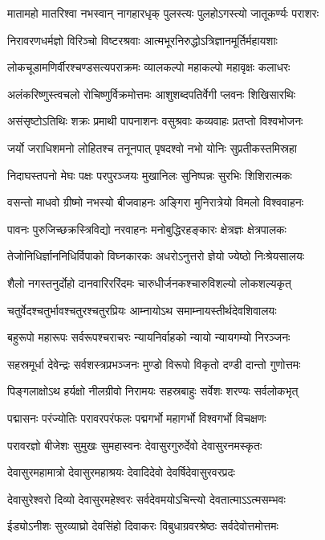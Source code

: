 \twolineshloka
{मातामहो मातरिश्वा नभस्वान् नागहारधृक्}
{पुलस्त्यः पुलहोऽगस्त्यो जातूकर्ण्यः पराशरः}

\twolineshloka
{निरावरणधर्मज्ञो विरिञ्चो विष्टरश्रवाः}
{आत्मभूरनिरुद्धोऽत्रिज्ञानमूर्तिर्महायशाः}

\twolineshloka
{लोकचूडामणिर्वीरश्चण्डसत्यपराक्रमः}
{व्यालकल्पो महाकल्पो महावृक्षः कलाधरः}

\twolineshloka
{अलंकरिष्णुस्त्वचलो रोचिष्णुर्विक्रमोत्तमः}
{आशुशब्दपतिर्वेगी प्लवनः शिखिसारथिः}

\twolineshloka
{असंसृष्टोऽतिथिः शक्रः प्रमाथी पापनाशनः}
{वसुश्रवाः कव्यवाहः प्रतप्तो विश्वभोजनः}

\twolineshloka
{जर्यो जराधिशमनो लोहितश्च तनूनपात्}
{पृषदश्वो नभो योनिः सुप्रतीकस्तमिस्रहा}

\twolineshloka
{निदाघस्तपनो मेघः पक्षः परपुरञ्जयः}
{मुखानिलः सुनिष्पन्नः सुरभिः शिशिरात्मकः}

\twolineshloka
{वसन्तो माधवो ग्रीष्मो नभस्यो बीजवाहनः}
{अङ्गिरा मुनिरात्रेयो विमलो विश्ववाहनः}

\twolineshloka
{पावनः पुरुजिच्छक्रस्त्रिविद्यो नरवाहनः}
{मनोबुद्धिरहङ्कारः क्षेत्रज्ञः क्षेत्रपालकः}

\twolineshloka
{तेजोनिधिर्ज्ञाननिधिर्विपाको विघ्नकारकः}
{अधरोऽनुत्तरो ज्ञेयो ज्येष्ठो निःश्रेयसालयः}

\twolineshloka
{शैलो नगस्तनुर्दोहो दानवारिररिंदमः}
{चारुधीर्जनकश्चारुविशल्यो लोकशल्यकृत्}

\twolineshloka
{चतुर्वेदश्चतुर्भावश्चतुरश्चतुरप्रियः}
{आम्नायोऽथ समाम्नायस्तीर्थदेवशिवालयः}

\twolineshloka
{बहुरूपो महारूपः सर्वरूपश्चराचरः}
{न्यायनिर्वाहको न्यायो न्यायगम्यो निरञ्जनः}

\twolineshloka
{सहस्रमूर्धा देवेन्द्रः सर्वशस्त्रप्रभञ्जनः}
{मुण्डो विरूपो विकृतो दण्डी दान्तो गुणोत्तमः}

\twolineshloka
{पिङ्गलाक्षोऽथ हर्यक्षो नीलग्रीवो निरामयः}
{सहस्रबाहुः सर्वेशः शरण्यः सर्वलोकभृत्}

\twolineshloka
{पद्मासनः परंज्योतिः परावरपरंफलः}
{पद्मगर्भो महागर्भो विश्वगर्भो विचक्षणः}

\twolineshloka
{परावरज्ञो बीजेशः सुमुखः सुमहास्वनः}
{देवासुरगुरुर्देवो देवासुरनमस्कृतः}

\twolineshloka
{देवासुरमहामात्रो देवासुरमहाश्रयः}
{देवादिदेवो देवर्षिदेवासुरवरप्रदः}

\twolineshloka
{देवासुरेश्वरो दिव्यो देवासुरमहेश्वरः}
{सर्वदेवमयोऽचिन्त्यो देवतात्माऽऽत्मसम्भवः}

\twolineshloka
{ईड्योऽनीशः सुरव्याघ्रो देवसिंहो दिवाकरः}
{विबुधाग्रवरश्रेष्ठः सर्वदेवोत्तमोत्तमः}

